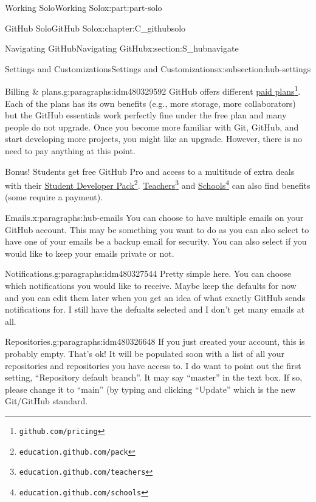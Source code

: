 \documentclass[oneside,10pt,]{book}
\begin{document}
\begin{partptx}{Working Solo}{}{Working Solo}{}{}{x:part:part-solo}
\begin{chapterptx}{GitHub Solo}{}{GitHub Solo}{}{}{x:chapter:C_githubsolo}
\begin{sectionptx}{Navigating GitHub}{}{Navigating GitHub}{}{}{x:section:S_hubnavigate}
\begin{subsectionptx}{Settings and Customizations}{}{Settings and Customizations}{}{}{x:subsection:hub-settings}
\begin{paragraphs}{Billing \& plans.}{g:paragraphs:idm480329592}
GitHub offers different \href{https://github.com/pricing}{paid plans}\footnote{\nolinkurl{github.com/pricing}\label{g:fn:idm480332024}}. Each of the plans has its own benefits (e.g., more storage, more collaborators) but the GitHub essentials work perfectly fine under the free plan and many people do not upgrade. Once you become more familiar with Git, GitHub, and start developing more projects, you might like an upgrade. However, there is no need to pay anything at this point.%
\par
Bonus! Students get free GitHub Pro and access to a multitude of extra deals with their \href{https://education.github.com/pack}{Student Developer Pack}\footnote{\nolinkurl{education.github.com/pack}\label{g:fn:idm480330872}}. \href{https://education.github.com/teachers}{Teachers}\footnote{\nolinkurl{education.github.com/teachers}\label{g:fn:idm480332152}} and \href{https://education.github.com/schools}{Schools}\footnote{\nolinkurl{education.github.com/schools}\label{g:fn:idm480331256}} can also find benefits (some require a payment).%
\end{paragraphs}%
\begin{paragraphs}{Emails.}{x:paragraphs:hub-emails}%
%
You can choose to have multiple emails on your GitHub account. This may be something you want to do as you can also select to have one of your emails be a backup email for security. You can also select if you would like to keep your emails private or not.%
\end{paragraphs}%
\begin{paragraphs}{Notifications.}{g:paragraphs:idm480327544}%
%
Pretty simple here. You can choose which notifications you would like to receive. Maybe keep the defaults for now and you can edit them later when you get an idea of what exactly GitHub sends notifications for. I still have the defualts selected and I don't get many emails at all.%
\end{paragraphs}%
\begin{paragraphs}{Repositories.}{g:paragraphs:idm480326648}%
%
%
If you just created your account, this is probably empty. That's ok! It will be populated soon with a list of all your repositories and repositories you have access to. I do want to point out the first setting, ``Repository default branch''. It may say ``master'' in the text box. If so, please change it to ``main'' (by typing and clicking ``Update'' which is the new Git\slash{}GitHub standard.%
\par

\end{paragraphs}
\end{subsectionptx}
\end{sectionptx}
\end{chapterptx}
\end{partptx}
\end{document}
